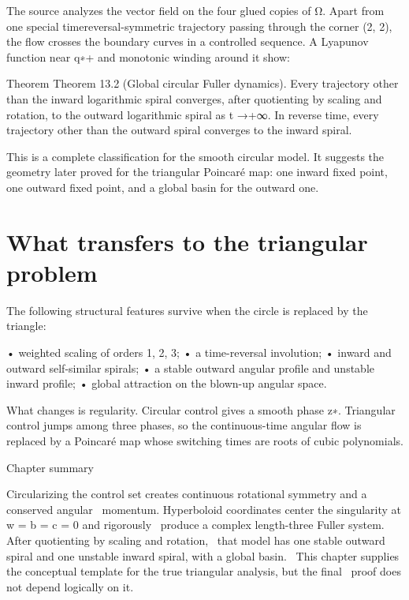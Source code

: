The source analyzes the vector field on the four glued copies of Ω. Apart from one special timereversal-symmetric trajectory passing through the corner (2, 2), the flow crosses the boundary curves in a controlled sequence. A Lyapunov function near q∗+ and monotonic winding around it show:


\begin{statementbox}{Theorem}
Theorem 13.2 (Global circular Fuller dynamics). Every trajectory other than the inward logarithmic spiral converges, after quotienting by scaling and rotation, to the outward logarithmic spiral as t →+∞. In reverse time, every trajectory other than the outward spiral converges to the inward spiral.
\end{statementbox}

This is a complete classification for the smooth circular model. It suggests the geometry later proved for the triangular Poincaré map: one inward fixed point, one outward fixed point, and a global basin for the outward one.


\section{What transfers to the triangular problem}

The following structural features survive when the circle is replaced by the triangle:


• weighted scaling of orders 1, 2, 3; • a time-reversal involution; • inward and outward self-similar spirals; • a stable outward angular profile and unstable inward profile; • global attraction on the blown-up angular space.


What changes is regularity. Circular control gives a smooth phase z∗. Triangular control jumps among three phases, so the continuous-time angular flow is replaced by a Poincaré map whose switching times are roots of cubic polynomials.


\begin{insightbox}{Chapter summary}
\end{insightbox}

\begin{displaytext}
Circularizing the control set creates continuous rotational symmetry and a conserved angular \
momentum. Hyperboloid coordinates center the singularity at w = b = c = 0 and rigorously \
produce a complex length-three Fuller system. After quotienting by scaling and rotation, \
that model has one stable outward spiral and one unstable inward spiral, with a global basin. \
This chapter supplies the conceptual template for the true triangular analysis, but the final \
proof does not depend logically on it.
\end{displaytext}
